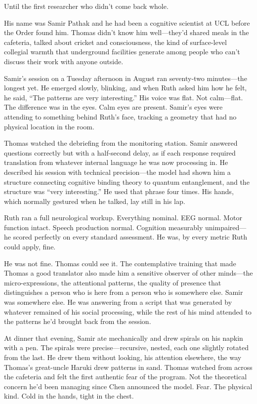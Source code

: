 Until the first researcher who didn't come back whole.

\scenebreak

His name was Samir Pathak and he had been a cognitive scientist at UCL before the Order found him. Thomas didn't know him well---they'd shared meals in the cafeteria, talked about cricket and consciousness, the kind of surface-level collegial warmth that underground facilities generate among people who can't discuss their work with anyone outside.

Samir's session on a Tuesday afternoon in August ran seventy-two minutes---the longest yet. He emerged slowly, blinking, and when Ruth asked him how he felt, he said, ``The patterns are very interesting.'' His voice was flat. Not calm---flat. The difference was in the eyes. Calm eyes are present. Samir's eyes were attending to something behind Ruth's face, tracking a geometry that had no physical location in the room.

Thomas watched the debriefing from the monitoring station. Samir answered questions correctly but with a half-second delay, as if each response required translation from whatever internal language he was now processing in. He described his session with technical precision---the model had shown him a structure connecting cognitive binding theory to quantum entanglement, and the structure was ``very interesting.'' He used that phrase four times. His hands, which normally gestured when he talked, lay still in his lap.

Ruth ran a full neurological workup. Everything nominal. EEG normal. Motor function intact. Speech production normal. Cognition measurably unimpaired---he scored perfectly on every standard assessment. He was, by every metric Ruth could apply, fine.

He was not fine. Thomas could see it. The contemplative training that made Thomas a good translator also made him a sensitive observer of other minds---the micro-expressions, the attentional patterns, the quality of presence that distinguishes a person who is here from a person who is somewhere else. Samir was somewhere else. He was answering from a script that was generated by whatever remained of his social processing, while the rest of his mind attended to the patterns he'd brought back from the session.

At dinner that evening, Samir ate mechanically and drew spirals on his napkin with a pen. The spirals were precise---recursive, nested, each one slightly rotated from the last. He drew them without looking, his attention elsewhere, the way Thomas's great-uncle Haruki drew patterns in sand. Thomas watched from across the cafeteria and felt the first authentic fear of the program. Not the theoretical concern he'd been managing since Chen announced the model. Fear. The physical kind. Cold in the hands, tight in the chest.

